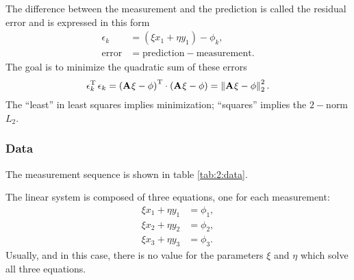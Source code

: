 The difference between the measurement and the prediction is called the residual error and is expressed in this form
\begin{equation}
  \begin{split}
    \epsilon_{k} &= (\xi x_{1} + \eta y_{1}) - \phi_{k},\\
    \text{error} &= \text{prediction} - \text{measurement}.
  \end{split}
\end{equation}
The goal is to minimize the quadratic sum of these errors
\begin{equation}
  \epsilon_{k}^{\mathrm{T}}\,\epsilon_{k} = \left( \textbf{A}^{\mathrm{}}\xi - \phi \right)^{\mathrm{T}}\cdot\left( \textbf{A}^{\mathrm{}}\xi - \phi \right) = \left\lVert\textbf{A}^{\mathrm{}}\xi - \phi\right\rVert_{2}^{2}.
\end{equation}
The ``least'' in least squares implies minimization; ``squares'' implies the $2-$norm $L_{2}$.

\subsubsection{Data}
The measurement sequence is shown in table \eqref{tab:2:data}.
\begin{table}[h]
\begin{center}
\end{center}
\caption{The measurement sequence. These values form the system matrix $\A{}$ and the data vector $\phi$. The duplicate measurement locations will completely change the nature of the problem and the solution.}
\label{tab:2:data}
\end{table}%
The linear system is composed of three equations, one for each measurement:
\begin{equation}
  \begin{split}
    \xi x_{1} + \eta y_{1} &= \phi_{1}, \\
    \xi x_{2} + \eta y_{2} &= \phi_{2}, \\
    \xi x_{3} + \eta y_{3} &= \phi_{3}.
  \end{split}
\end{equation}
Usually, and in this case, there is no value for the parameters $\xi$ and $\eta$ which solve all three equations. 

